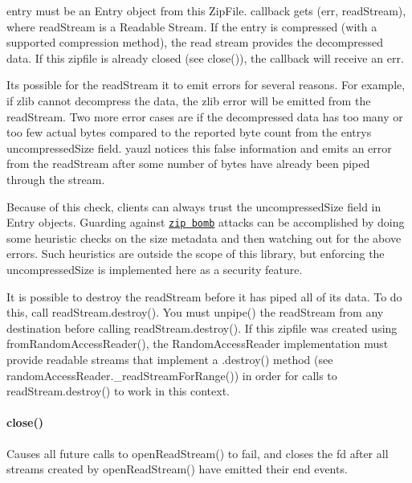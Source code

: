 {\ttfamily entry} must be an {\ttfamily Entry} object from this {\ttfamily Zip\+File}. {\ttfamily callback} gets {\ttfamily (err, read\+Stream)}, where {\ttfamily read\+Stream} is a {\ttfamily Readable Stream}. If the entry is compressed (with a supported compression method), the read stream provides the decompressed data. If this zipfile is already closed (see {\ttfamily close()}), the {\ttfamily callback} will receive an {\ttfamily err}.

It\textquotesingle{}s possible for the {\ttfamily read\+Stream} it to emit errors for several reasons. For example, if zlib cannot decompress the data, the zlib error will be emitted from the {\ttfamily read\+Stream}. Two more error cases are if the decompressed data has too many or too few actual bytes compared to the reported byte count from the entry\textquotesingle{}s {\ttfamily uncompressed\+Size} field. yauzl notices this false information and emits an error from the {\ttfamily read\+Stream} after some number of bytes have already been piped through the stream.

Because of this check, clients can always trust the {\ttfamily uncompressed\+Size} field in {\ttfamily Entry} objects. Guarding against \href{http://en.wikipedia.org/wiki/Zip_bomb}{\tt zip bomb} attacks can be accomplished by doing some heuristic checks on the size metadata and then watching out for the above errors. Such heuristics are outside the scope of this library, but enforcing the {\ttfamily uncompressed\+Size} is implemented here as a security feature.

It is possible to destroy the {\ttfamily read\+Stream} before it has piped all of its data. To do this, call {\ttfamily read\+Stream.\+destroy()}. You must {\ttfamily unpipe()} the {\ttfamily read\+Stream} from any destination before calling {\ttfamily read\+Stream.\+destroy()}. If this zipfile was created using {\ttfamily from\+Random\+Access\+Reader()}, the {\ttfamily Random\+Access\+Reader} implementation must provide readable streams that implement a {\ttfamily .destroy()} method (see {\ttfamily random\+Access\+Reader.\+\_\+read\+Stream\+For\+Range()}) in order for calls to {\ttfamily read\+Stream.\+destroy()} to work in this context.

\paragraph*{close()}

Causes all future calls to {\ttfamily open\+Read\+Stream()} to fail, and closes the fd after all streams created by {\ttfamily open\+Read\+Stream()} have emitted their {\ttfamily end} events.

